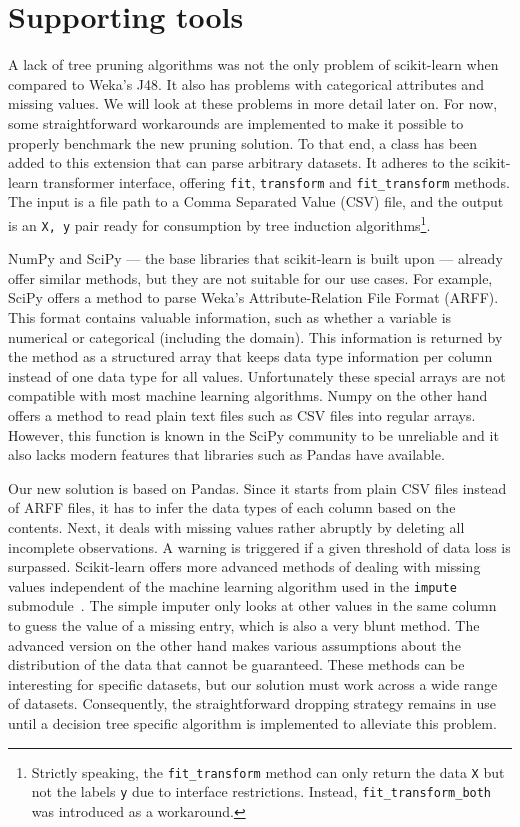 \section{Supporting tools}
\label{sec:csvimporter}
A lack of tree pruning algorithms was not the only problem of scikit-learn when compared to Weka's J48. It also has problems with categorical attributes and missing values. We will look at these problems in more detail later on. For now, some straightforward workarounds are implemented to make it possible to properly benchmark the new pruning solution. To that end, a  class has been added to this extension that can parse arbitrary datasets. It adheres to the scikit-learn transformer interface, offering \texttt{fit}, \texttt{transform} and \texttt{fit\_transform} methods. The input is a file path to a Comma Separated Value (CSV) file, and the output is an \texttt{X, y} pair ready for consumption by tree induction algorithms\footnote{Strictly speaking, the \texttt{fit\_transform} method can only return the data \texttt{X} but not the labels \texttt{y} due to interface restrictions. Instead, \texttt{fit\_transform\_both} was introduced as a workaround.}.


NumPy and SciPy --- the base libraries that scikit-learn is built upon --- already offer similar methods, but they are not suitable for our use cases. For example, SciPy offers a method to parse Weka's Attribute-Relation File Format (ARFF). This format contains valuable information, such as whether a variable is numerical or categorical (including the domain). This information is returned by the method as a structured array that keeps data type information per column instead of one data type for all values. Unfortunately these special arrays are not compatible with most machine learning algorithms. Numpy on the other hand offers a method to read plain text files such as CSV files into regular arrays. However, this function is known in the SciPy community to be unreliable and it also lacks modern features that libraries such as Pandas have available.

Our new solution is based on Pandas. Since it starts from plain CSV files instead of ARFF files, it has to infer the data types of each column based on the contents. Next, it deals with missing values rather abruptly by deleting all incomplete observations. A warning is triggered if a given threshold of data loss is surpassed. Scikit-learn offers more advanced methods of dealing with missing values independent of the machine learning algorithm used in the \texttt{impute} submodule~\cite{imputation}. The simple imputer only looks at other values in the same column to guess the value of a missing entry, which is also a very blunt method. The advanced version on the other hand makes various assumptions about the distribution of the data that cannot be guaranteed. These methods can be interesting for specific datasets, but our solution must work across a wide range of datasets. Consequently, the straightforward dropping strategy remains in use until a decision tree specific algorithm is implemented to alleviate this problem.

